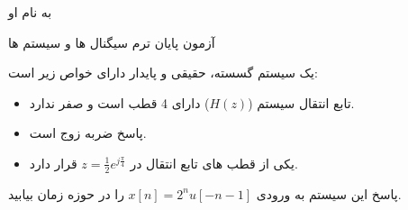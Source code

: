 \documentclass{article}
\begin{document}
\begin{center}
\large

به نام او

آزمون پایان ترم سیگنال ها و سیستم ها
\end{center}

\hrulefill

\large


یک سیستم گسسته، حقیقی و پایدار دارای خواص زیر است:
\begin{itemize}
\item
تابع انتقال سیستم ($H(z)$) دارای 4 قطب است و صفر ندارد.
\item
پاسخ ضربه زوج است.
\item
یکی از قطب های تابع انتقال در 
$
z=\frac{1}{2}e^{j\frac{\pi}{4}}
$
قرار دارد.
\end{itemize}

پاسخ این سیستم به ورودی 
$
x[n]=2^nu[-n-1]
$
 را در حوزه زمان بیابید.
\end{document}
